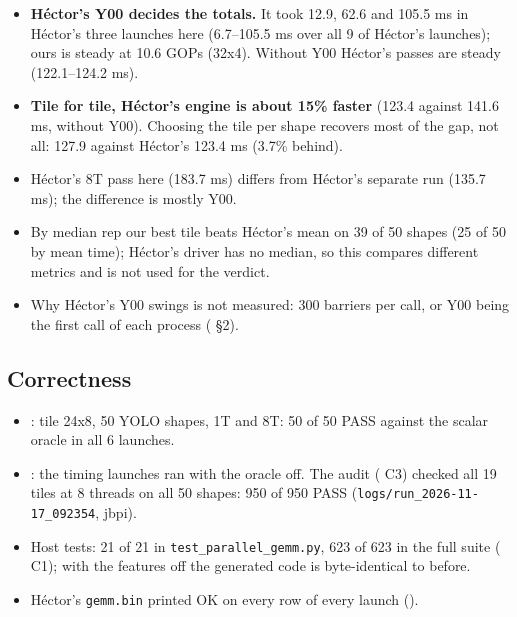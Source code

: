 \begin{itemize}\setlength\itemsep{1pt}
\item \textbf{H\'ector's Y00 decides the totals.} It took 12.9, 62.6 and 105.5 ms in H\'ector's three launches here (6.7--105.5 ms over all 9 of H\'ector's launches); ours is steady at 10.6 GOPs (32x4). Without Y00 H\'ector's passes are steady (122.1--124.2 ms).
\item \textbf{Tile for tile, H\'ector's engine is about 15\% faster} (123.4 against 141.6 ms, without Y00). Choosing the tile per shape recovers most of the gap, not all: 127.9 against H\'ector's 123.4 ms (3.7\% behind).
\item H\'ector's 8T pass here (183.7 ms) differs from H\'ector's separate  run (135.7 ms); the difference is mostly Y00.
\item By median rep our best tile beats H\'ector's mean on 39 of 50 shapes (25 of 50 by mean time); H\'ector's driver has no median, so this compares different metrics and is not used for the verdict.
\item Why H\'ector's Y00 swings is not measured: 300 barriers per call, or Y00 being the first call of each process ( \S2).
\end{itemize}

\subsection{Correctness}
\begin{itemize}\setlength\itemsep{1pt}
\item {}: tile 24x8, 50 YOLO shapes, 1T and 8T: 50 of 50 PASS against the scalar oracle in all 6 launches.
\item {}: the timing launches ran with the oracle off. The audit ( C3) checked all 19 tiles at 8 threads on all 50 shapes: 950 of 950 PASS (\texttt{logs/run\_2026-11-17\_092354}, jbpi).
\item Host tests: 21 of 21 in \texttt{test\_parallel\_gemm.py}, 623 of 623 in the full suite ( C1); with the features off the generated code is byte-identical to before.
\item H\'ector's \texttt{gemm.bin} printed OK on every row of every launch ().
\end{itemize}
